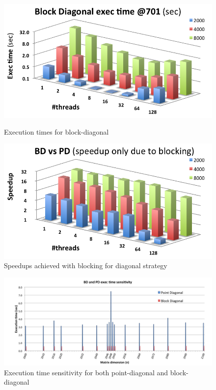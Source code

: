 \documentclass[../thesis]{subfiles}
\begin{document}
	\begin{figure}[p]
		\begin{minipage}[t]{0.47\textwidth}
			\centering
			\includegraphics[width=\textwidth]{assets/images/multicore/block-diagonal.png}
			\caption{Execution times for block-diagonal}
			\label{fig:multicore:block:diagonal:times}
		\end{minipage}
		\hfill
		\begin{minipage}[t]{0.48\textwidth}
			\centering
			\includegraphics[width=\textwidth]{assets/images/multicore/blocking-speedup.png}
			\caption{Speedups achieved with blocking for diagonal strategy}
			\label{fig:multicore:blocking:speedup}
		\end{minipage}
	\end{figure}

	\begin{figure}[p]
		\centering
		\includegraphics[height=0.28\textheight]{assets/images/multicore/resonance.png}
		\captionsetup{font=small}
		\caption{Execution time sensitivity for both point-diagonal and block-diagonal}
		\label{fig:multicore:sensitivity}
	\end{figure}
\end{document}

